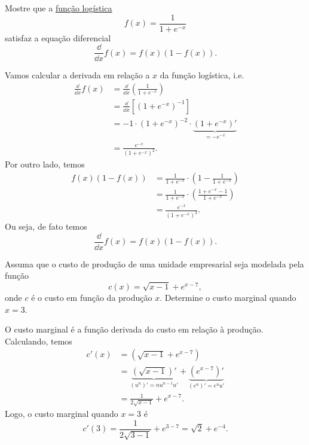 \begin{exeresol}
  Mostre que a \href{https://pt.wikipedia.org/wiki/Fun%C3%A7%C3%A3o_log%C3%ADstica}{função logística}
  \begin{equation}
    f(x) = \frac{1}{1+e^{-x}}
  \end{equation}
  satisfaz a equação diferencial
  \begin{equation}
    \frac{\dd}{\dd x}f(x) = f(x)(1-f(x)).
  \end{equation}
\end{exeresol}
\begin{resol}
  Vamos calcular a derivada em relação a $x$ da função logística, i.e.
  \begin{align}
    \frac{\dd}{\dd x}f(x) &= \frac{\dd}{\dd x}\left(\frac{1}{1+e^{-x}}\right) \\
          &= \frac{\dd}{\dd x}\left[\left(1+e^{-x}\right)^{-1}\right] \\
          &= -1\cdot\left(1+e^{-x}\right)^{-2}\cdot\underbrace{\left(1+e^{-x}\right)'}_{=-e^{-x}} \\
          &= \frac{e^{-x}}{\left(1+e^{-x}\right)^{2}}.
  \end{align}
  Por outro lado, temos
  \begin{align}
    f(x)(1-f(x)) &= \frac{1}{1+e^{-x}}\cdot\left(1 - \frac{1}{1+e^{-x}}\right) \\
                 &= \frac{1}{1+e^{-x}}\cdot\left(\frac{1+e^{-x}-1}{1+e^{-x}}\right) \\
                 &= \frac{e^{-x}}{\left(1+e^{-x}\right)^{2}}.
  \end{align}
  Ou seja, de fato temos
  \begin{equation}
    \frac{\dd}{\dd x}f(x) = f(x)(1-f(x)).
  \end{equation}  
\end{resol}

\begin{exeresol}
  Assuma que o custo de produção de uma unidade empresarial seja modelada pela função
  \begin{equation}
    c(x) = \sqrt{x-1} + e^{x-7},
  \end{equation}
  onde $c$ é o custo em função da produção $x$. Determine o custo marginal quando $x=3$.
\end{exeresol}
\begin{resol}
  O custo marginal é a função derivada do custo em relação à produção. Calculando, temos
  \begin{align}
    c'(x) &= \left(\sqrt{x-1} + e^{x-7}\right)\\
          &= \underbrace{\left(\sqrt{x-1}\right)'}_{(u^n)' = nu^{n-1}u'} + \underbrace{\left(e^{x-7}\right)'}_{(e^u)' = e^uu'}\\
          &= \frac{1}{2\sqrt{x-1}} + e^{x-7}.
  \end{align}
  Logo, o custo marginal quando $x=3$ é
  \begin{equation}
    c'(3) = \frac{1}{2\sqrt{3-1}} + e^{3-7} = \sqrt{2} + e^{-4}.
  \end{equation}
\end{resol}

